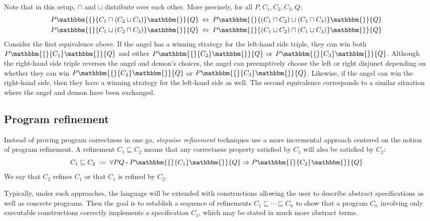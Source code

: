 \documentclass[11pt,oneside,draft]{book}
\theoremstyle{definition}
\newcommand{\bdot}{\boldsymbol{\cdot}}
\newcommand{\htr}[3]{{ {#1} \mathbbm{\{} {#2} \mathbbm{\}} {#3} }}
\begin{document}
Note that in this setup,
$\sqcap$ and $\sqcup$ distribute over each other.
More precisely, for all $P, C_1, C_2, C_3, Q$:
\begin{align*}
  \htr{P}{C_1 \sqcap (C_2 \sqcup C_3)}{Q} \: &\Leftrightarrow \:
    \htr{P}{(C_1 \sqcap C_2) \sqcup (C_1 \sqcap C_3)}{Q} \\
  \htr{P}{C_1 \sqcup (C_2 \sqcap C_3)}{Q} \: &\Leftrightarrow \:
    \htr{P}{(C_1 \sqcup C_2) \sqcap (C_1 \sqcup C_3)}{Q}
\end{align*}
Consider the first equivalence above.
If the angel has a winning strategy for
the left-hand side triple,
they can win both $\htr{P}{C_1}{Q}$
and either $\htr{P}{C_2}{Q}$ or $\htr{P}{C_3}{Q}$.
Although the right-hand side triple
reverses the angel and demon's choices,
the angel can preemptively choose the left or right
disjunct depending on whether they can win
$\htr{P}{C_2}{Q}$ or $\htr{P}{C_3}{Q}$.
Likewise, if the angel can win the right-hand side,
then they have a winning strategy for the left-hand side as well.
The second equivalence corresponds to a similar situation
where the angel and demon have been exchanged.


\subsection{Program refinement} %

Instead of proving program correctness in one go,
\emph{stepwise refinement} techniques use a more incremental approach
centered on the notion of program refinement.
A refinement $C_1 \sqsubseteq C_2$
means that any correctness property satisfied by $C_1$
will also be satisfied by $C_2$:
\[
    C_1 \sqsubseteq C_2 \: := \:
    \forall P Q \bdot
      \htr{P}{C_1}{Q} \Rightarrow
      \htr{P}{C_2}{Q}
\]
We say that $C_2$ refines $C_1$
or that $C_1$ is refined by $C_2$.

Typically,
under such approaches,
the language will be extended with constructions
allowing the user to describe
abstract specifications as well as
concrete programs.
Then the goal is to establish
a sequence of refinements
$C_1 \sqsubseteq \cdots \sqsubseteq C_n$
to show that a program $C_n$ involving
only executable constructions
correctly implements a specification $C_1$,
which may be stated in much more abstract terms.
\end{document}
